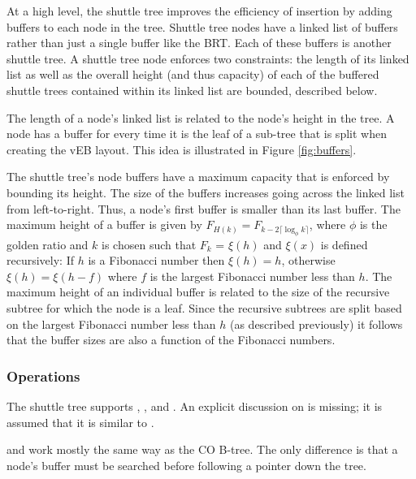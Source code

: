 \documentclass[preprint]{style}
\begin{document}
At a high level, the shuttle tree improves the efficiency of insertion by
adding buffers to each node in the tree. Shuttle tree nodes have a
linked list of buffers rather than just a single buffer like the BRT. Each of
these buffers is another shuttle tree. A shuttle tree node enforces two
constraints: the length of its linked list as well as the overall height (and
thus capacity) of each of the buffered shuttle trees contained within its
linked list are bounded, described below.

The length of a node's linked list is related to the node's height in the tree.
A node has a buffer for every time it is the leaf of a sub-tree that is split
when creating the vEB layout. This idea is illustrated in Figure
\ref{fig:buffers}.

The shuttle tree's node buffers have a maximum capacity that is enforced by
bounding its height. The size of the buffers increases going across the linked
list from left-to-right. Thus, a node's first buffer is smaller than its last
buffer. The maximum height of a buffer is given by $F_{H(k)} = F_{k-2 \lceil
\log_{\phi} k \rceil}$, where $\phi$ is the golden ratio and $k$ is chosen such
that $F_k$ = $\xi(h)$ and $\xi(x)$ is defined recursively: If $h$ is a
Fibonacci number then $\xi(h) = h$, otherwise $\xi(h) = \xi(h-f)$ where $f$ is
the largest Fibonacci number less than $h$. The maximum height of an individual
buffer is related to the size of the recursive subtree for which the node is a
leaf.  Since the recursive subtrees are split based on the largest Fibonacci
number less than $h$ (as described previously) it follows that the buffer sizes
are also a function of the Fibonacci numbers.

\subsubsection{Operations}

The shuttle tree supports \Search{}, \Insert{}, and \Scan{}. An explicit
discussion on \Delete{} is missing; it is assumed that it is similar 
to \Insert{}.

\Search{} and \Scan{} work mostly the same way as the CO B-tree. The only
difference is that a node's buffer must be searched before following a
pointer down the tree.
\end{document}
